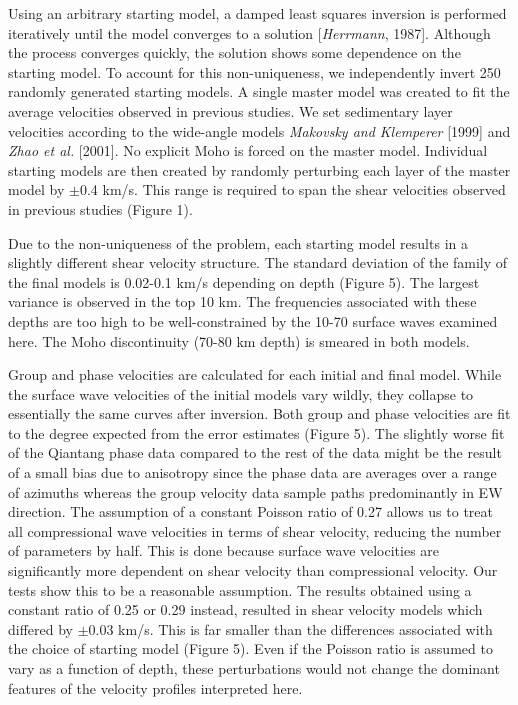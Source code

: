 \documentclass[12pt]{article}
\begin{document}
Using an arbitrary starting model, a damped least squares inversion is performed iteratively until the model converges to a
solution [{\it Herrmann}, 1987].  Although the process converges quickly, the solution shows some dependence on the starting model.
To account for this non-uniqueness, we independently invert 250 randomly generated starting models.  A single master model
was created to fit the average velocities observed in previous studies.  We set sedimentary layer
velocities according to the wide-angle models {\it
Makovsky and Klemperer} [1999] and {\it Zhao et
al.} [2001].  No explicit Moho is forced on the master model.  Individual starting models are then created
by randomly perturbing each layer of the master model by $\pm$0.4 km/s.  This range is required to span the
shear velocities observed in previous studies (Figure 1).

Due to the non-uniqueness of the problem, each starting model results in a slightly different shear
velocity structure.  The standard deviation of the family of the final models is 0.02-0.1 km/s depending on
depth (Figure 5).  The largest variance is observed in the top 10 km.  The frequencies associated with
these depths are too high to be well-constrained by the 10-70 surface waves examined here. The Moho discontinuity (70-80 km depth) is smeared in both models.

Group and phase velocities are calculated for each initial and final model.  While the surface wave
velocities of the initial models vary wildly, they collapse to essentially the same curves after inversion.
Both group and phase velocities are fit to the degree expected from the error
  estimates (Figure 5).   The slightly worse fit of the Qiantang phase data
  compared to the rest of the data might be the result of a small bias due to
  anisotropy since the phase data are averages over a range of azimuths whereas the
  group velocity data sample paths predominantly in EW direction.
The assumption of a constant Poisson ratio of 0.27 allows us to treat all compressional wave velocities in
terms of shear velocity, reducing the number of parameters by half. This is done because surface wave
velocities are significantly more dependent on shear velocity than compressional velocity.  Our tests show
this to be a reasonable assumption.  The results obtained using a constant ratio of 0.25 or 0.29 instead,
resulted in shear velocity models which differed by $\pm$0.03 km/s.  This is far smaller than the differences
associated with the choice of starting model (Figure 5).  Even if the Poisson ratio is assumed to vary as a
function of depth, these perturbations would not change the dominant features of the
velocity profiles interpreted here.
\end{document}
